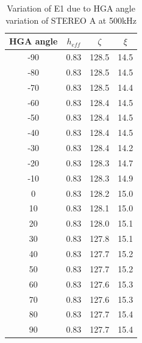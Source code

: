 \documentclass[galley,ras]{agu2001}
\begin{document}
\begin{article}
\begin{table}
\caption{Variation of E1 due to HGA angle variation of STEREO A at 500kHz}\label{tab_e1_var}
\begin{flushleft}
\begin{tabular}{c|ccc}
\hline
HGA angle & $h_{eff}$ & $\zeta$ & $\xi$ \\
\hline
 -90 & 0.83 & 128.5 & 14.5 \\
 -80 & 0.83 & 128.5 & 14.5 \\
 -70 & 0.83 & 128.5 & 14.4 \\
 -60 & 0.83 & 128.4 & 14.5 \\
 -50 & 0.83 & 128.4 & 14.5 \\
 -40 & 0.83 & 128.4 & 14.5 \\
 -30 & 0.83 & 128.4 & 14.2 \\
 -20 & 0.83 & 128.3 & 14.7 \\
 -10 & 0.83 & 128.3 & 14.9 \\
 0 & 0.83 & 128.2 & 15.0 \\
 10 & 0.83 & 128.1 & 15.0 \\
 20 & 0.83 & 128.0 & 15.1 \\
 30 & 0.83 & 127.8 & 15.1 \\
 40 & 0.83 & 127.7 & 15.2 \\
 50 & 0.83 & 127.7 & 15.2 \\
 60 & 0.83 & 127.6 & 15.3 \\
 70 & 0.83 & 127.6 & 15.3 \\
 80 & 0.83 & 127.7 & 15.4 \\
 90 & 0.83 & 127.7 & 15.4 \\
\hline
\end{tabular}
\end{flushleft}
\end{table}



%
%
%
%
%



\end{article}
\end{document}
